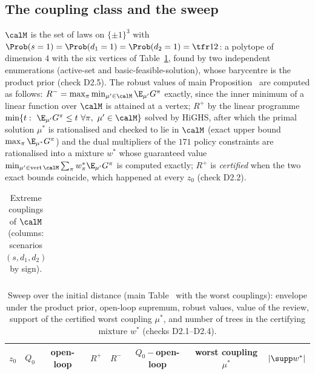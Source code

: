 \subsection{The coupling class and the sweep}
$\calM$ is the set of laws on $\{\pm1\}^3$ with $\Prob(s=1)=\Prob(d_1=1)=\Prob(d_2=1)=\tfr12$: a polytope of dimension $4$ with the six vertices of Table~\ref{tab:vertices}, found by two independent enumerations (active-set and basic-feasible-solution), whose barycentre is the product prior (check D2.5). The robust values of main Proposition~ are computed as follows: $R^-=\max_\pi\min_{\mu'\in\calM}\E_{\mu'}G^\pi$ exactly, since the inner minimum of a linear function over $\calM$ is attained at a vertex; $R^+$ by the linear programme $\min\{t:\ \E_{\mu'}G^\pi\le t\ \forall\pi,\ \mu'\in\calM\}$ solved by HiGHS, after which the primal solution $\mu^\ast$ is rationalised and checked to lie in $\calM$ (exact upper bound $\max_\pi\E_{\mu^\ast}G^\pi$) and the dual multipliers of the $171$ policy constraints are rationalised into a mixture $w^\ast$ whose guaranteed value $\min_{\mu'\in\operatorname{vert}\calM}\sum_\pi w^\ast_\pi\E_{\mu'}G^\pi$ is computed exactly; $R^+$ is \emph{certified} when the two exact bounds coincide, which happened at every $z_0$ (check D2.2).

\begin{table}[H]
\centering\small
\caption{Extreme couplings of $\calM$ (columns: scenarios $(s,d_1,d_2)$ by sign).}
\label{tab:vertices}
\begin{tabular}{lcccccccc}
\toprule

\bottomrule
\end{tabular}
\end{table}

\begin{table}[H]
\centering\small
\caption{Sweep over the initial distance (main Table~ with the worst couplings): envelope under the product prior, open-loop supremum, robust values, value of the review, support of the certified worst coupling $\mu^\ast$, and number of trees in the certifying mixture $w^\ast$ (checks D2.1--D2.4).}
\begin{tabular}{cccccccc}
\toprule
$z_0$ & $Q_0$ & open-loop & $R^+$ & $R^-$ & $Q_0-$open-loop & worst coupling $\mu^\ast$ & $|\supp w^\ast|$\\
\midrule

\bottomrule
\end{tabular}
\end{table}

